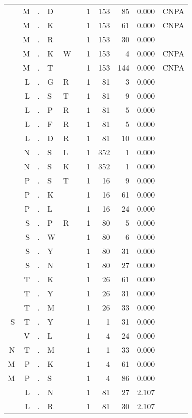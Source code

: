 \begin{longtable}{r@{ } r@{ } c@{ } l@{ } l@{ } l@{ } r r r r l }
  & M & . & D &   &   & 1 & 153 & 85 & 0.000 & \textsc{CNPA} \\
  & M & . & K &   &   & 1 & 153 & 61 & 0.000 & \textsc{CNPA} \\
  & M & . & R &   &   & 1 & 153 & 30 & 0.000 &  \\
  & M & . & K & W &   & 1 & 153 & 4 & 0.000 & \textsc{CNPA} \\
  & M & . & T &   &   & 1 & 153 & 144 & 0.000 & \textsc{CNPA} \\
  & L & . & G & R &   & 1 & 81 & 3 & 0.000 &  \\
  & L & . & S & T &   & 1 & 81 & 9 & 0.000 &  \\
  & L & . & P & R &   & 1 & 81 & 5 & 0.000 &  \\
  & L & . & F & R &   & 1 & 81 & 5 & 0.000 &  \\
  & L & . & D & R &   & 1 & 81 & 10 & 0.000 &  \\
  & N & . & S & L &   & 1 & 352 & 1 & 0.000 &  \\
  & N & . & S & K &   & 1 & 352 & 1 & 0.000 &  \\
  & P & . & S & T &   & 1 & 16 & 9 & 0.000 &  \\
  & P & . & K &   &   & 1 & 16 & 61 & 0.000 &  \\
  & P & . & L &   &   & 1 & 16 & 24 & 0.000 &  \\
  & S & . & P & R &   & 1 & 80 & 5 & 0.000 &  \\
  & S & . & W &   &   & 1 & 80 & 6 & 0.000 &  \\
  & S & . & Y &   &   & 1 & 80 & 31 & 0.000 &  \\
  & S & . & N &   &   & 1 & 80 & 27 & 0.000 &  \\
  & T & . & K &   &   & 1 & 26 & 61 & 0.000 &  \\
  & T & . & Y &   &   & 1 & 26 & 31 & 0.000 &  \\
  & T & . & M &   &   & 1 & 26 & 33 & 0.000 &  \\
S & T & . & Y &   &   & 1 & 1 & 31 & 0.000 &  \\
  & V & . & L &   &   & 1 & 4 & 24 & 0.000 &  \\
N & T & . & M &   &   & 1 & 1 & 33 & 0.000 &  \\
M & P & . & K &   &   & 1 & 4 & 61 & 0.000 &  \\
M & P & . & S &   &   & 1 & 4 & 86 & 0.000 &  \\
  & L & . & N &   &   & 1 & 81 & 27 & 2.107 &  \\
  & L & . & R &   &   & 1 & 81 & 30 & 2.107 &  \\

\end{longtable}
